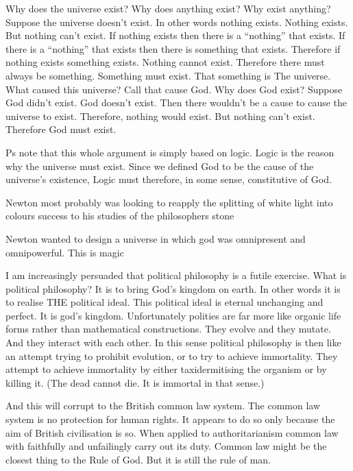 Why does the universe exist? 
Why does anything exist? 
Why exist anything? 
Suppose the universe doesn’t exist. 
In other words nothing exists. 
Nothing exists. 
But nothing can’t exist. 
If nothing exists then there is a “nothing” that exists. 
If there is a “nothing” that exists then there is something that exists. 
Therefore if nothing exists something exists.
Nothing cannot exist. 
Therefore there must always be something. 
Something must exist. 
That something is The universe. 
What caused this universe? 
Call that cause God. 
Why does God exist? 
Suppose God didn’t exist. 
God doesn’t exist. 
Then there wouldn’t be a cause to cause the universe to exist. 
Therefore, nothing would exist. 
But nothing can’t exist. 
Therefore God must exist. 


Ps note that this whole argument is simply based on logic. Logic is the reason why the universe must exist. Since we defined God to be the cause of the universe’s existence, Logic must therefore, in some sense, constitutive of God. 



Newton most probably was looking to reapply the splitting of white light into colours success to his studies of the philosophers stone

Newton wanted to design a universe in which god was omnipresent and omnipowerful. 
This is magic 


I am increasingly persuaded that political philosophy is a futile exercise. What is political philosophy? It is to bring God’s kingdom on earth. In other words it is to realise THE political ideal. This political ideal is eternal unchanging and perfect. It is god’s kingdom. 
Unfortunately polities are far more like organic life forms rather than mathematical constructions. They evolve and they mutate. And they interact with each other. In this sense political philosophy is then like an attempt trying to prohibit evolution, or to try to achieve immortality. They attempt to achieve immortality by either taxidermitising the organism or by killing it. (The dead cannot die. It is immortal in that sense.) 



And this will corrupt to the British common law system. The common law system is no protection for human rights. It appears to do so only because the aim of British civilisation is so. When applied to authoritarianism common law with faithfully and unfailingly carry out its duty. Common law might be the closest thing to the Rule of God. But it is still the rule of man. 


